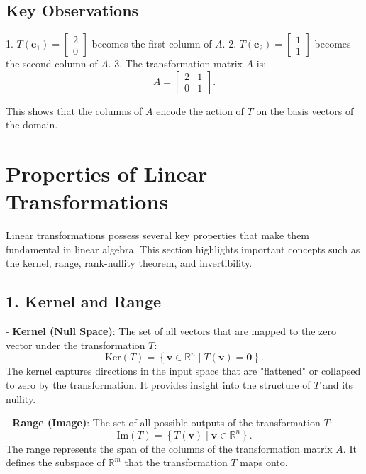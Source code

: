 \documentclass[11pt]{article}
\begin{document}
\subsection*{Key Observations}
1. \( T(\mathbf{e}_1) = \begin{bmatrix} 2 \\ 0 \end{bmatrix} \) becomes the first column of \( A \).
2. \( T(\mathbf{e}_2) = \begin{bmatrix} 1 \\ 1 \end{bmatrix} \) becomes the second column of \( A \).
3. The transformation matrix \( A \) is:
\[
A = \begin{bmatrix} 2 & 1 \\ 0 & 1 \end{bmatrix}.
\]

This shows that the columns of \( A \) encode the action of \( T \) on the basis vectors of the domain.

\section{\textbf{Properties of Linear Transformations}}

Linear transformations possess several key properties that make them fundamental in linear algebra. This section highlights important concepts such as the kernel, range, rank-nullity theorem, and invertibility.

\subsection*{1. Kernel and Range}

- \textbf{Kernel (Null Space)}: The set of all vectors that are mapped to the zero vector under the transformation \( T \):
\[
\text{Ker}(T) = \left\{\mathbf{v} \in \mathbb{R}^n \mid T(\mathbf{v}) = \mathbf{0}\right\}.
\]
The kernel captures directions in the input space that are "flattened" or collapsed to zero by the transformation. It provides insight into the structure of \( T \) and its nullity.

- \textbf{Range (Image)}: The set of all possible outputs of the transformation \( T \):
\[
\text{Im}(T) = \left\{T(\mathbf{v}) \mid \mathbf{v} \in \mathbb{R}^n\right\}.
\]
The range represents the span of the columns of the transformation matrix \( A \). It defines the subspace of \( \mathbb{R}^m \) that the transformation \( T \) maps onto.
\end{document}
